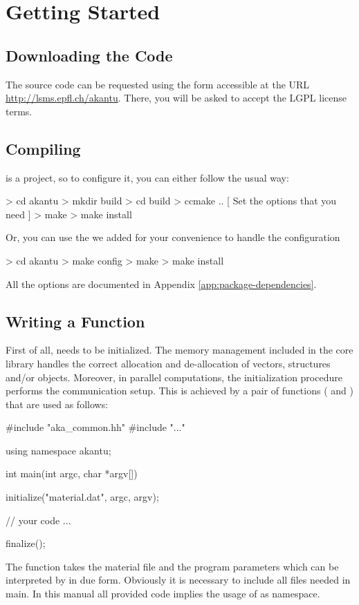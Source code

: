 \chapter{Getting Started}
\section{Downloading the Code}

The \akantu source code can be requested using the form accessible at the URL
\url{http://lsms.epfl.ch/akantu}.  There, you will be asked to accept the LGPL
license terms.

\section{Compiling \akantu}

\akantu is a  project, so to configure it, you can either
follow the usual way:
\begin{command}
  > cd akantu
  > mkdir build
  > cd build
  > ccmake ..
  [ Set the options that you need ]
  > make
  > make install
\end{command}

\noindent Or, you can use the  we added for your
convenience to handle the  configuration

\begin{command}
  > cd akantu
  > make config
  > make
  > make install
\end{command}

\noindent All the \akantu options are documented in Appendix
\ref{app:package-dependencies}.


\section{Writing a  Function\label{sect:common:main}}
\label{sec:writing_main}

First of all, \akantu needs to be initialized.  The memory management
included in the core library handles the correct allocation and
de-allocation of vectors, structures and/or objects. Moreover, in
parallel computations, the initialization procedure performs the
communication setup. This is achieved by a pair of functions
( and ) that are used as follows:
\begin{cpp}
#include "aka_common.hh"
#include "..."

using namespace akantu;

int main(int argc, char *argv[]) {
  initialize("material.dat", argc, argv);

  // your code
  ...

  finalize();
}
\end{cpp}
The  function takes the material file and the program
parameters which can be interpreted by \akantu in due form. Obviously
it is necessary to include all files needed in main. In this manual
all provided code implies the usage of  as namespace.

